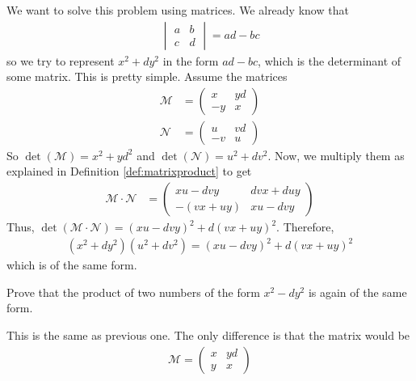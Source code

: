 \begin{solution}
We want to solve this problem using matrices. We already know that
	\begin{align*}
		\begin{vmatrix}
			a&b\\
			c&d
		\end{vmatrix} = ad-bc
	\end{align*}
so we try to represent $x^2+dy^2$ in the form $ad-bc$, which is the determinant of some matrix. This is pretty simple. Assume the matrices
	\begin{align*}
		\mathcal{M}
			& =
			\begin{pmatrix}
				x & yd\\
				-y & x
			\end{pmatrix}\\
		\mathcal{N}
			& =
			\begin{pmatrix}
				u & vd\\
				-v & u
			\end{pmatrix}
	\end{align*}
So $\det(\mathcal M)=x^2+yd^2$ and $\det(\mathcal{N})=u^2+dv^2$.
Now, we multiply them as explained in Definition \eqref{def:matrixproduct} to get
	\begin{align*}
		\mathcal{M}\cdot\mathcal{N}
			& =
			\begin{pmatrix}
				xu-dvy & dvx+duy\\
				-(vx+uy) & xu-dvy
			\end{pmatrix}
	\end{align*}
Thus, $\det(\mathcal{M \cdot N})=(xu-dvy)^2+d(vx+uy)^2$. Therefore,
\begin{align*}
(x^2+dy^2)(u^2+dv^2)=(xu-dvy)^2+d(vx+uy)^2
\end{align*}
which is of the same form.
\end{solution}

\begin{problem}
Prove that the product of two numbers of the form $x^2-dy^2$ is again of the same form.
\end{problem}

\begin{solution}
This is the same as previous one. The only difference is that the matrix would be
\begin{align*}
\mathcal{M}=\begin{pmatrix}
x & yd\\
y & x
\end{pmatrix}
\end{align*}
\end{solution}

